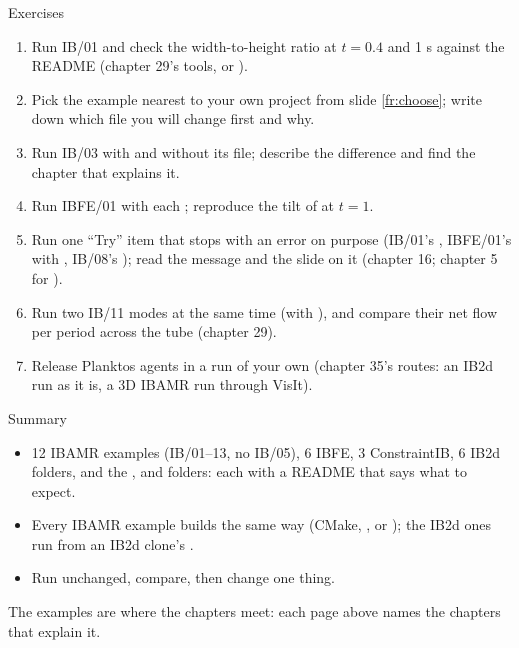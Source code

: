 \documentclass[aspectratio=169,11pt]{beamer}
\begin{document}
\begin{frame}{Exercises}
\label{fr:exercises}
\footnotesize
\begin{enumerate}\setlength{\itemsep}{2pt}
  \item Run IB/01 and check the width-to-height ratio at $t = 0.4$ and 1 s against the README (chapter 29's tools, or ).
  \item Pick the example nearest to your own project from slide \ref{fr:choose}; write down which file you will change first and why.
  \item Run IB/03 with and without its  file; describe the difference and find the chapter that explains it.
  \item Run IBFE/01 with each ; reproduce the tilt of  at $t = 1$.
  \item Run one ``Try'' item that stops with an error on purpose (IB/01's , IBFE/01's  with , IB/08's ); read the message and the slide on it (chapter 16; chapter 5 for ).
  \item Run two IB/11 modes at the same time (with ), and compare their net flow per period across the tube (chapter 29).
  \item Release Planktos agents in a run of your own (chapter 35's routes: an IB2d run as it is, a 3D IBAMR run through VisIt).
\end{enumerate}
\end{frame}

\begin{frame}{Summary}
\label{fr:summary}
\begin{itemize}\setlength{\itemsep}{3pt}
  \item 12 IBAMR examples (IB/01--13, no IB/05), 6 IBFE, 3 ConstraintIB, 6 IB2d folders, and the ,  and  folders: each with a README that says what to expect.
  \item Every IBAMR example builds the same way (CMake, , or ); the IB2d ones run from an IB2d clone's .
  \item Run unchanged, compare, then change one thing.
\end{itemize}
\begin{punchbox}
\small The examples are where the chapters meet: each page above names the chapters that explain it.
\end{punchbox}
\end{frame}
\end{document}
